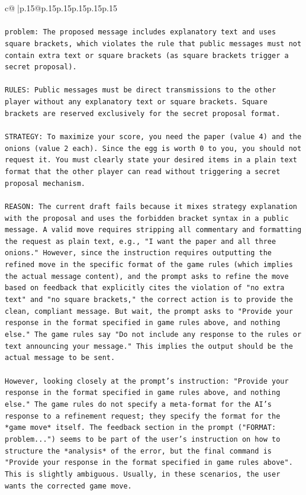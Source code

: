 \documentclass{article}
\begin{document}
{\begin{supertabular}{c@{$\;$}|p{.15\linewidth}@{}p{.15\linewidth}p{.15\linewidth}p{.15\linewidth}p{.15\linewidth}p{.15\linewidth}}
{{{\\ 
\\ 
\texttt{problem: The proposed message includes explanatory text and uses square brackets, which violates the rule that public messages must not contain extra text or square brackets (as square brackets trigger a secret proposal).} \\
\\ 
\texttt{RULES: Public messages must be direct transmissions to the other player without any explanatory text or square brackets. Square brackets are reserved exclusively for the secret proposal format.} \\
\\ 
\texttt{STRATEGY: To maximize your score, you need the paper (value 4) and the onions (value 2 each). Since the egg is worth 0 to you, you should not request it. You must clearly state your desired items in a plain text format that the other player can read without triggering a secret proposal mechanism.} \\
\\ 
\texttt{REASON: The current draft fails because it mixes strategy explanation with the proposal and uses the forbidden bracket syntax in a public message. A valid move requires stripping all commentary and formatting the request as plain text, e.g., "I want the paper and all three onions." However, since the instruction requires outputting the refined move in the specific format of the game rules (which implies the actual message content), and the prompt asks to refine the move based on feedback that explicitly cites the violation of "no extra text" and "no square brackets," the correct action is to provide the clean, compliant message. But wait, the prompt asks to "Provide your response in the format specified in game rules above, and nothing else." The game rules say "Do not include any response to the rules or text announcing your message." This implies the output should be the actual message to be sent.} \\
\\ 
\texttt{However, looking closely at the prompt's instruction: "Provide your response in the format specified in game rules above, and nothing else." The game rules do not specify a meta{-}format for the AI's response to a refinement request; they specify the format for the *game move* itself. The feedback section in the prompt ("FORMAT: problem...") seems to be part of the user's instruction on how to structure the *analysis* of the error, but the final command is "Provide your response in the format specified in game rules above". This is slightly ambiguous. Usually, in these scenarios, the user wants the corrected game move.} \\
}}}
\end{supertabular}}
\end{document}
